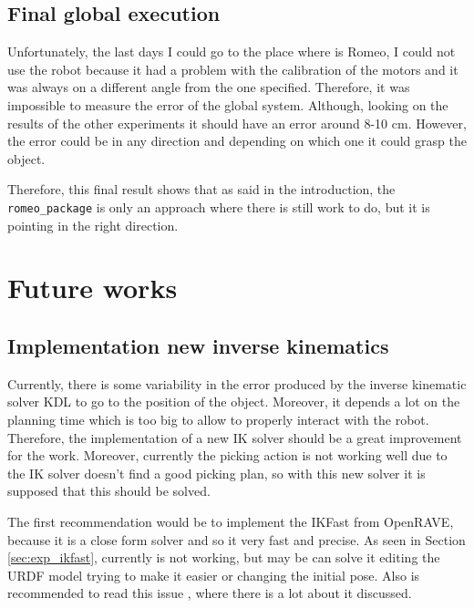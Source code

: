 \documentclass[12pt,a4paper,final,twoside,openright]{report}
\begin{document}
\section{Final global execution}

Unfortunately, the last days I could go to the place where is Romeo, I could not use the robot because it had a problem with the calibration of the motors and it was always on a different angle from the one specified. Therefore, it was impossible to measure the error of the global system. Although, looking on the results of the other experiments it should have an error around 8-10 cm. However, the error could be in any direction and depending on which one it could grasp the object. 

Therefore, this final result shows that as said in the introduction, the \texttt{romeo\_package} is only an approach where there is still work to do, but it is pointing in the right direction.  

\chapter{Future works}
\label{cha:future_works}

\section{Implementation new inverse kinematics}

Currently, there is some variability in the error produced by the inverse kinematic solver KDL to go to the position of the object. Moreover, it depends a lot on the planning time which is too big to allow to properly interact with the robot. Therefore, the implementation of a new IK solver should be a great improvement for the work. Moreover, currently the picking action is not working well due to the IK solver doesn't find a good picking plan, so with this new solver it is supposed that this should be solved.

The first recommendation would be to implement the IKFast from OpenRAVE, because it is a close form solver and so it very fast and precise. As seen in Section \ref{sec:exp_ikfast}, currently is not working, but may be can solve it editing the URDF model trying to make it easier or changing the initial pose. Also is recommended to read this issue \cite{romeoRobotIssue}, where there is a lot about it discussed.
\end{document}
